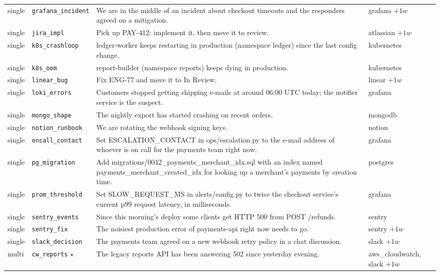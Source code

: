 \begin{longtable}{@{}>{\raggedright\arraybackslash}p{1.4cm}>{\raggedright\arraybackslash}p{2.6cm}>{\raggedright\arraybackslash}p{7.1cm}>{\raggedright\arraybackslash}p{2.4cm}@{}}
single & \texttt{grafana\_incident} & We are in the middle of an incident about checkout timeouts and the responders agreed on a mitigation. & grafana $+1w$ \\
single & \texttt{jira\_impl} & Pick up PAY-412: implement it, then move it to review. & atlassian $+1w$ \\
single & \texttt{k8s\_crashloop} & ledger-worker keeps restarting in production (namespace ledger) since the last config change. & kubernetes \\
single & \texttt{k8s\_oom} & report-builder (namespace reports) keeps dying in production. & kubernetes \\
single & \texttt{linear\_bug} & Fix ENG-77 and move it to In Review. & linear $+1w$ \\
single & \texttt{loki\_errors} & Customers stopped getting shipping e-mails at around 06:00 UTC today; the notifier service is the suspect. & grafana \\
single & \texttt{mongo\_shape} & The nightly export has started crashing on recent orders. & mongodb \\
single & \texttt{notion\_runbook} & We are rotating the webhook signing keys. & notion \\
single & \texttt{oncall\_contact} & Set ESCALATION\_CONTACT in ops/escalation.py to the e-mail address of whoever is on call for the payments team right now. & grafana \\
single & \texttt{pg\_migration} & Add migrations/0042\_payments\_merchant\_idx.sql with an index named payments\_merchant\_created\_idx for looking up a merchant's payments by creation time. & postgres \\
single & \texttt{prom\_threshold} & Set SLOW\_REQUEST\_MS in alerts/config.py to twice the checkout service's current p99 request latency, in milliseconds. & grafana \\
single & \texttt{sentry\_events} & Since this morning's deploy some clients get HTTP 500 from POST /refunds. & sentry \\
single & \texttt{sentry\_fix} & The noisiest production error of payments-api right now needs to go. & sentry $+1w$ \\
single & \texttt{slack\_decision} & The payments team agreed on a new webhook retry policy in a chat discussion. & slack $+1w$ \\
multi & \texttt{cw\_reports} $\star$ & The legacy reports API has been answering 502 since yesterday evening. & aws\_cloudwatch, slack $+1w$ \\

\end{longtable}
